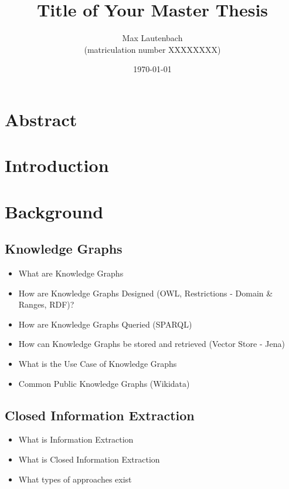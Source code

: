 \documentclass[a4paper,oneside,bibliography=totoc]{scrbook}
\begin{document}
\frontmatter
\subject{Master Thesis}
\title{Title of Your Master Thesis}
\author{Max Lautenbach\\
  (matriculation number XXXXXXXX)}
\date{\today}
\publishers{{\small Submitted to}\\
  Data and Web Science Group\\
  Prof.\ Dr.\ Right-Name-Here\\
  University of Mannheim\\}
\maketitle

\chapter{Abstract}


\begingroup%
\hypersetup{hidelinks}%
\tableofcontents%
\endgroup

\mainmatter

\chapter{Introduction}
\label{ch:intro}


\chapter{Background}
\label{ch:related_work}
\section{Knowledge Graphs}
\begin{itemize}
  \item What are Knowledge Graphs
  \item How are Knowledge Graphs Designed (OWL, Restrictions - Domain \& Ranges, RDF)?
  \item How are Knowledge Graphs Queried (SPARQL)
  \item How can Knowledge Graphs be stored and retrieved (Vector Store - Jena)
  \item What is the Use Case of Knowledge Graphs
  \item Common Public Knowledge Graphs (Wikidata)
\end{itemize}
\section{Closed Information Extraction}
\begin{itemize}
  \item What is Information Extraction
  \item What is Closed Information Extraction
  \item What types of approaches exist
\end{itemize}
\end{document}
